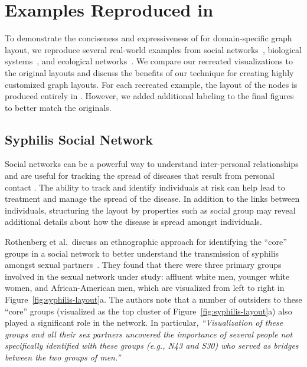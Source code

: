 \section{Examples Reproduced in \projectname}
\label{sec:examples}

To demonstrate the conciseness and expressiveness of \projectname for domain-specific
graph layout, we reproduce several real-world examples from social 
networks~\cite{rothenberg1998using}, biological systems~\cite{barsky2008cerebral}, 
and ecological networks~\cite{kruger2017,baskerville2011spatial}. 
We compare our recreated visualizations to the original layouts and 
discuss the benefits of our technique for creating highly customized graph layouts.
For each recreated example, the layout of the nodes is produced
entirely in \projectname. However, we added additional labeling to the 
final figures to better match the originals.



\subsection{Syphilis Social Network}
\syphilisLayout
\syphilisSpec

Social networks can be a powerful way to understand inter-personal
relationships and are useful for tracking the spread of diseases that
result from personal contact \cite{rothenberg1998using,fitzpatrick2001preventable,mcelroy2003network,fu2011hiv}.
The ability to track and identify individuals at risk can help
lead to treatment and manage the spread of the disease. In
addition to the links between individuals, structuring the layout by
properties such as social group may reveal additional details about
how the disease is spread amongst individuals.

Rothenberg et al.\ discuss an ethnographic approach for identifying the
``core'' groups in a social network to better understand the transmission
of syphilis amongst sexual partners~\cite{rothenberg1998using}. They found
that there were three primary groups involved in the sexual network under study:
affluent white men, younger white women, and African-American men, 
which are visualized from left to right in Figure~\ref{fig:syphilis-layout}a. 
The authors note that a number of outsiders to these ``core'' groups
(visualized as the top cluster of Figure~\ref{fig:syphilis-layout}a) 
also played a significant role in the network. In
particular, \emph{``Visualization of these groups and all their sex
  partners uncovered the importance of several people not specifically
  identified with these groups (e.g., N43 and S30) who served as bridges
  between the two groups of men.''}

